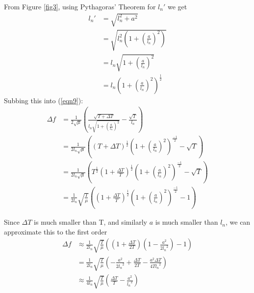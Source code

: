 \documentclass[11pt]{article}
\begin{document}
\begin{flushleft}
                From Figure \ref{fig3}, using Pythagoras' Theorem for $l_n'$ we get
                \begin{align}
                    l_n' &= \sqrt{l_n^2+a^2} \\
                    &= \sqrt{l_n^2\left(1+\left(\frac{a}{l_n}\right) ^2\right)} \\
                    &= l_n \sqrt{1+\left(\frac{a}{l_n}\right) ^2} \\
                    &= l_n \left(1+\left(\frac{a}{l_n}\right) ^2\right)^{\frac{1}{2}} 
                \end{align}
                Subbing this into (\ref{eqn9}):
                \begin{align}
                    \Delta f &= \frac{1}{2\sqrt{\mu}} \left( \frac{\sqrt{T+\Delta T}}{l_n\sqrt{1+\left(\frac{a}{l_n}\right) ^2}} - \frac{\sqrt{T}}{l_n} \right) \\
                    &= \frac{1}{2l_n\sqrt{\mu}} \left( (T+\Delta T)^{\frac{1}{2}} \left( 1+\left(\frac{a}{l_n}\right) ^2\right)^{\frac{-1}{2}} - \sqrt{T} \right) \\
                    &= \frac{1}{2l_n\sqrt{\mu}} \left( T^{\frac{1}{2}}\left(1+\frac{\Delta T}{T}\right)^{\frac{1}{2}} \left( 1+\left(\frac{a}{l_n}\right) ^2\right)^{\frac{-1}{2}} - \sqrt{T} \right) \\
                    &= \frac{1}{2l_n} \sqrt{\frac{T}{\mu}}\left(\left(1+\frac{\Delta T}{T}\right)^{\frac{1}{2}} \left( 1+\left(\frac{a}{l_n}\right) ^2\right)^{\frac{-1}{2}} - 1 \right)
                \end{align}

                Since $\Delta T$ is much smaller than T, and similarly $a$ is much smaller than $l_n$, we can approximate this to the first order
                \begin{align}
                    \Delta f &\approx \frac{1}{2l_n} \sqrt{\frac{T}{\mu}} \left( \left(1+\frac{\Delta T}{2T}\right) \left( 1- \frac{a^2}{2{l_n}^2} \right) - 1\right) \\
                    &= \frac{1}{2l_n} \sqrt{\frac{T}{\mu}} \left( -\frac{a^2}{2{l_n}^2} + \frac{\Delta T}{2T} - \frac{a^2\Delta T}{4T{l_n}^2}\right) \\
                    &\approx \frac{1}{4l_n} \sqrt{\frac{T}{\mu}} \left( \frac{\Delta T}{T} - \frac{a^2}{{l_n}^2} \right) \label{eqn20}
                \end{align}


\end{flushleft}
\end{document}
